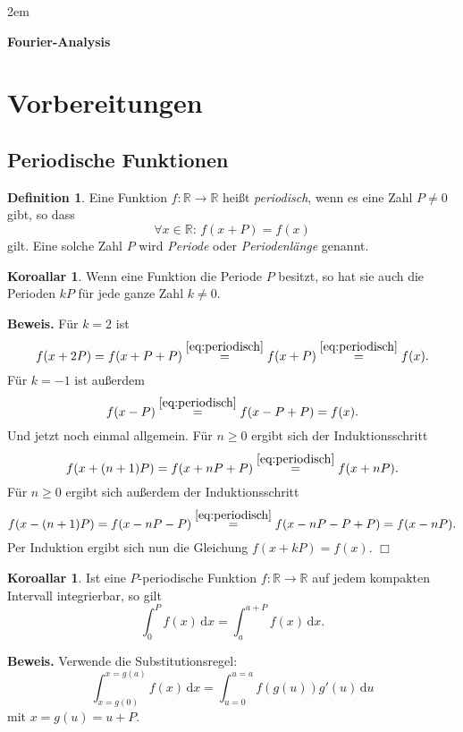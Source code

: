 \documentclass[a4paper,11pt,fleqn,twoside]{article}
\newcommand{\R}{\mathbb R}
\newcommand{\emdef}[1]{\emph{#1}}
\theoremstyle{definition}
\newtheorem{Definition}{Definition}
\theoremstyle{theorem}
\newtheorem{Korollar}[Satz]{Koroallar}
\numberwithin{equation}{section}
\begin{document}
\thispagestyle{empty}

\vglue 2em
{\center\LARGE\bfseries Fourier-Analysis\par}

\tableofcontents

\section{Vorbereitungen}
\subsection{Periodische Funktionen}

\begin{Definition}
Eine Funktion $f\colon\R\to\R$ heißt \emdef{periodisch}, wenn es eine
Zahl $P\ne 0$ gibt, so dass
\begin{equation}\label{eq:periodisch}
\forall x\in\R\colon\, f(x+P)=f(x)
\end{equation}
gilt. Eine solche Zahl $P$ wird \emdef{Periode} oder
\emdef{Periodenlänge} genannt.
\end{Definition}

\begin{Korollar}
Wenn eine Funktion die Periode $P$ besitzt, so hat sie auch die
Perioden $kP$ für jede ganze Zahl $k\ne 0$.
\end{Korollar}
\noindent
\textbf{Beweis.} Für $k=2$ ist
\begin{equation}
f(x+2P) = f(x+P+P) \stackrel{\eqref{eq:periodisch}}=
f(x+P) \stackrel{\eqref{eq:periodisch}}= f(x).
\end{equation}
Für $k=-1$ ist außerdem
\begin{equation}
f(x-P) \stackrel{\eqref{eq:periodisch}}= f(x-P+P) = f(x).
\end{equation}
Und jetzt noch einmal allgemein. Für $n\ge 0$ ergibt sich der
Induktionsschritt
\begin{equation}
f(x+(n+1)P) = f(x+nP+P) \stackrel{\eqref{eq:periodisch}}= f(x+nP).
\end{equation}
Für $n\ge 0$ ergibt sich außerdem der Induktionsschritt
\begin{equation}
f(x-(n+1)P) = f(x-nP-P) \stackrel{\eqref{eq:periodisch}}=
f(x-nP-P+P) = f(x-nP).
\end{equation}
Per Induktion ergibt sich nun die Gleichung $f(x+kP) = f(x)$. $\Box$

\begin{Korollar}
Ist eine $P$-periodische Funktion $f\colon\R\to\R$ auf jedem
kompakten Intervall integrierbar, so gilt
\begin{equation}
\int_0^P f(x)\,\mathrm dx = \int_a^{a+P} f(x)\,\mathrm dx.
\end{equation}
\end{Korollar}
\noindent
\textbf{Beweis.} Verwende die Substitutionsregel:
\begin{equation}
\int_{x=g(0)}^{x=g(a)} f(x)\,\mathrm dx = \int_{u=0}^{u=a}
f(g(u))g'(u)\,\mathrm du
\end{equation}
mit $x=g(u)=u+P$.
\end{document}
